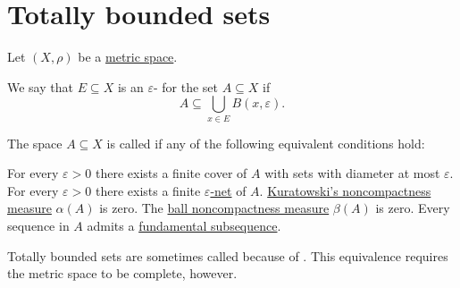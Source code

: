 \section{Totally bounded sets}\label{sec:totally_bounded_sets}

Let \( (X, \rho) \) be a \hyperref[def:metric_space]{metric space}.

\begin{definition}\label{def:epsilon_net}
  We say that \( E \subseteq X \) is an \( \varepsilon \)- for the set \( A \subseteq X \) if
  \begin{equation}
    A \subseteq \bigcup_{x \in E} B(x, \varepsilon).
  \end{equation}
\end{definition}

\begin{definition}\label{def:totally_bounded_set}
  The space \( A \subseteq X \) is called  if any of the following equivalent conditions hold:

  \begin{thmenum}
     For every \( \varepsilon > 0 \) there exists a finite cover of \( A \) with sets with diameter at most \( \varepsilon \).
     For every \( \varepsilon > 0 \) there exists a finite \hyperref[def:epsilon_net]{\( \varepsilon \)-net} of \( A \).
     \hyperref[def:noncompactness_measures/sets]{Kuratowski's noncompactness measure} \( \alpha(A) \) is zero.
     The \hyperref[def:noncompactness_measures/balls]{ball noncompactness measure} \( \beta(A) \) is zero.
     Every sequence in \( A \) admits a \hyperref[def:fundamental_net]{fundamental subsequence}.
  \end{thmenum}

  Totally bounded sets are sometimes called  because of . This equivalence requires the metric space to be complete, however.
\end{definition}
